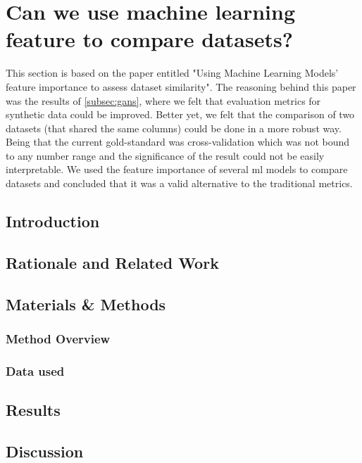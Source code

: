 



\section{Can we use machine learning feature to compare datasets?}\label{subsec:similarity}
This section is based on the paper entitled "Using Machine Learning Models' feature importance to assess dataset similarity". The reasoning behind this paper was the results of \ref*{subsec:gans}, where we felt that evaluation metrics for synthetic data could be improved. Better yet, we felt that the comparison of two datasets (that shared the same columns) could be done in a more robust way. Being that the current gold-standard was cross-validation which was not bound to any number range and the significance of the result could not be easily interpretable. We used the feature importance of several \ac{ml} models to compare datasets and concluded that it was a valid alternative to the traditional metrics.

\subsection{Introduction}

\subsection{Rationale and Related Work}

\subsection{Materials \& Methods}
\subsubsection{Method Overview}

\subsubsection{Data used}

\subsection{Results}

\subsection{Discussion}

